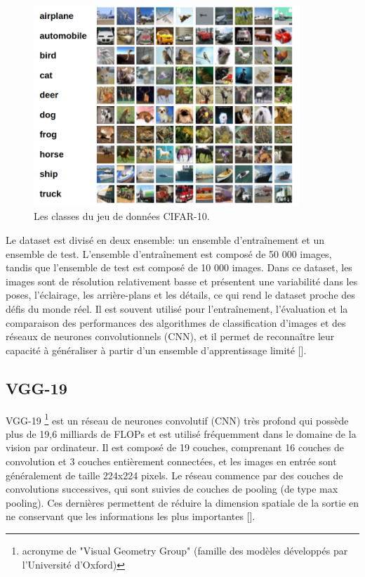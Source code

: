 \begin{figure}[hbt!]
  \centering
  \includegraphics[width=10cm]{images_pfe/cifar-10-classes.png}
  \caption{Les classes du jeu de données CIFAR-10.}
  \label{fig:cifar-10-classes}
\end{figure}
\FloatBarrier
\medskip

Le dataset est divisé en deux ensemble: un ensemble d'entraînement et un ensemble de test. L'ensemble d'entraînement est composé de 50 000 images, tandis que l'ensemble de test est composé de 10 000 images. Dans ce dataset, les images sont de résolution relativement basse et présentent une variabilité dans les poses, l'éclairage, les arrière-plans et les détails, ce qui rend le dataset proche des défis du monde réel. Il est souvent utilisé pour l'entraînement, l'évaluation et la comparaison des performances des algorithmes de classification d'images et des réseaux de neurones convolutionnels (CNN), et il permet de reconnaître leur capacité à généraliser à partir d'un ensemble d'apprentissage limité [\cite{krizhevsky2009learning}].

\subsection{VGG-19}
VGG-19 \footnote{acronyme de "Visual Geometry Group" (famille des modèles développés par l'Université d'Oxford)} est un réseau de neurones convolutif (CNN) très profond qui possède plus de 19,6 milliards de FLOPs et est utilisé fréquemment dans le domaine de la vision par ordinateur. Il est composé de 19 couches, comprenant 16 couches de convolution et 3 couches entièrement connectées, et les images en entrée sont généralement de taille 224x224 pixels. Le réseau commence par des couches de convolutions successives, qui sont suivies de couches de pooling (de type max pooling). Ces dernières permettent de réduire la dimension spatiale de la sortie en ne conservant que les informations les plus importantes [\cite{simonyan2014very}].

